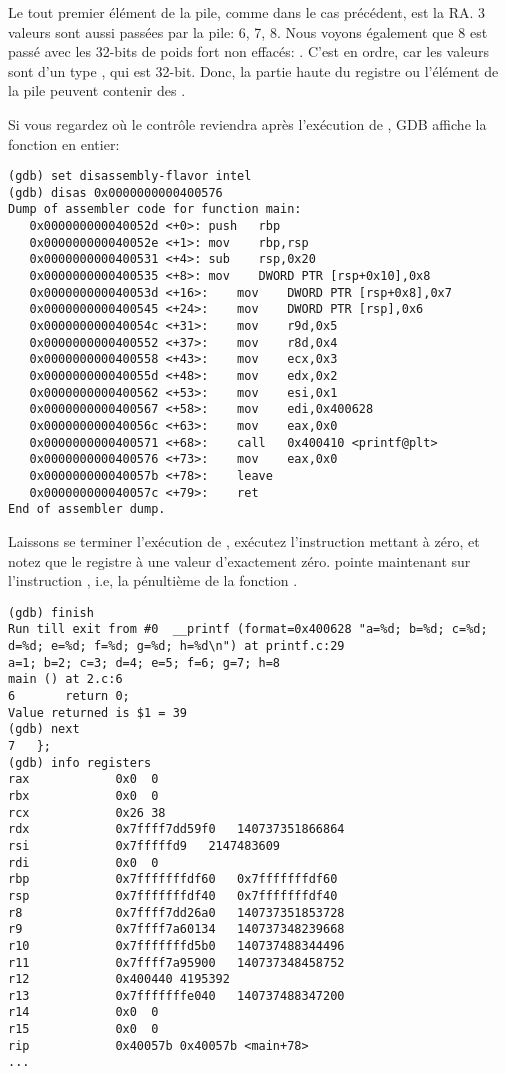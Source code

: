 Le tout premier élément de la pile, comme dans le cas précédent, est la \ac{RA}.
3 valeurs sont aussi passées par la pile: 6, 7, 8.
Nous voyons également que 8 est passé avec les 32-bits de poids fort non
effacés: .
C'est en ordre, car les valeurs sont d'un type \Tint, qui est 32-bit.
Donc, la partie haute du registre ou l'élément de la pile peuvent contenir des
.

Si vous regardez où le contrôle reviendra après l'exécution de \printf,
\ac{GDB} affiche la fonction \main en entier:

\begin{lstlisting}[style=customasmx86]
(gdb) set disassembly-flavor intel
(gdb) disas 0x0000000000400576
Dump of assembler code for function main:
   0x000000000040052d <+0>:	push   rbp
   0x000000000040052e <+1>:	mov    rbp,rsp
   0x0000000000400531 <+4>:	sub    rsp,0x20
   0x0000000000400535 <+8>:	mov    DWORD PTR [rsp+0x10],0x8
   0x000000000040053d <+16>:	mov    DWORD PTR [rsp+0x8],0x7
   0x0000000000400545 <+24>:	mov    DWORD PTR [rsp],0x6
   0x000000000040054c <+31>:	mov    r9d,0x5
   0x0000000000400552 <+37>:	mov    r8d,0x4
   0x0000000000400558 <+43>:	mov    ecx,0x3
   0x000000000040055d <+48>:	mov    edx,0x2
   0x0000000000400562 <+53>:	mov    esi,0x1
   0x0000000000400567 <+58>:	mov    edi,0x400628
   0x000000000040056c <+63>:	mov    eax,0x0
   0x0000000000400571 <+68>:	call   0x400410 <printf@plt>
   0x0000000000400576 <+73>:	mov    eax,0x0
   0x000000000040057b <+78>:	leave  
   0x000000000040057c <+79>:	ret    
End of assembler dump.
\end{lstlisting}

Laissons se terminer l'exécution de \printf, exécutez l'instruction mettant \EAX
à zéro, et notez que le registre \EAX à une valeur d'exactement zéro.
\RIP pointe maintenant sur l'instruction , i.e, la pénultième de la
fonction \main.

\begin{lstlisting}
(gdb) finish
Run till exit from #0  __printf (format=0x400628 "a=%d; b=%d; c=%d; d=%d; e=%d; f=%d; g=%d; h=%d\n") at printf.c:29
a=1; b=2; c=3; d=4; e=5; f=6; g=7; h=8
main () at 2.c:6
6		return 0;
Value returned is $1 = 39
(gdb) next
7	};
(gdb) info registers
rax            0x0	0
rbx            0x0	0
rcx            0x26	38
rdx            0x7ffff7dd59f0	140737351866864
rsi            0x7fffffd9	2147483609
rdi            0x0	0
rbp            0x7fffffffdf60	0x7fffffffdf60
rsp            0x7fffffffdf40	0x7fffffffdf40
r8             0x7ffff7dd26a0	140737351853728
r9             0x7ffff7a60134	140737348239668
r10            0x7fffffffd5b0	140737488344496
r11            0x7ffff7a95900	140737348458752
r12            0x400440	4195392
r13            0x7fffffffe040	140737488347200
r14            0x0	0
r15            0x0	0
rip            0x40057b	0x40057b <main+78>
...
\end{lstlisting}
